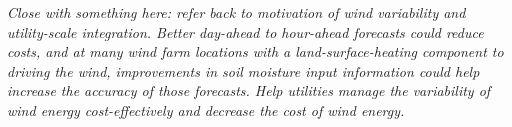 \textit{Close with something here: refer back to motivation of wind variability and utility-scale integration.  Better day-ahead to hour-ahead forecasts could reduce costs, and at many wind farm locations with a land-surface-heating component to driving the wind, improvements in soil moisture input information could help increase the accuracy of those forecasts.  Help utilities manage the variability of wind energy cost-effectively and decrease the cost of wind energy.}